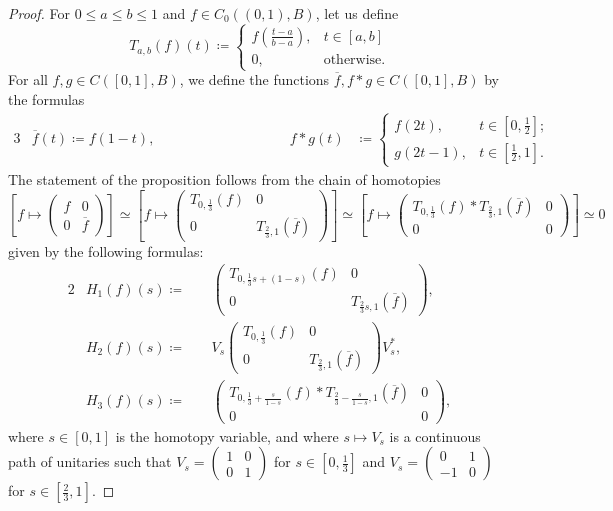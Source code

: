 \documentclass[10pt,a4paper]{amsart}
\begin{document}
\begin{proof}
For $0\leq a\leq b\leq1$ and $f\in C_{0}((0,1),B)$,
let us define
\[
T_{a,b}(f)(t)\coloneqq\begin{cases}
f\left(\frac{t-a}{b-a}\right), & t\in[a,b]\\
0, & \textrm{otherwise}.
\end{cases}
\]
For all $f,g\in C([0,1],B)$, we define the functions $\overline{f},f*g\in C([0,1],B)$
by the formulas
\begin{alignat*}{3}
 & \overline{f}(t)\coloneqq f(1-t), & \qquad\qquad\qquad\qquad & f*g(t) & \coloneqq\begin{cases}
f(2t), & t\in\left[0,\frac{1}{2}\right];\\
g(2t-1), & t\in\left[\frac{1}{2},1\right].
\end{cases}
\end{alignat*}
The statement of the proposition follows from the chain of homotopies
\[
\left[f\mapsto\left(\begin{array}{cc}
f & 0\\
0 & \overline{f}
\end{array}\right)\right]\simeq\left[f\mapsto\left(\begin{array}{cc}
T_{0,\frac{1}{3}}(f) & 0\\
0 & T_{\frac{2}{3},1}(\overline{f})
\end{array}\right)\right]\simeq\left[f\mapsto\left(\begin{array}{cc}
T_{0,\frac{1}{3}}(f)*T_{\frac{2}{3},1}(\overline{f}) & 0\\
0 & 0
\end{array}\right)\right]\simeq0
\]
given by the following formulas:
\begin{alignat*}{2}
 & H_{1}(f)(s)\coloneqq &\ 
& \left(\begin{array}{cc}
T_{0,\frac{1}{3}s+(1-s)}(f) & 0\\
0 & T_{\frac{2}{3}s,1}(\overline{f})
\end{array}\right),\\
 & H_{2}(f)(s)\coloneqq &\ 
& V_{s}\left(\begin{array}{cc}
T_{0,\frac{1}{3}}(f) & 0\\
0 & T_{\frac{2}{3},1}(\overline{f})
\end{array}\right)V^{*}_{s},\\
 & H_{3}(f)(s)\coloneqq &\ 
& \left(\begin{array}{cc}
T_{0,\frac{1}{3}+\frac{s}{1-s}}(f)*T_{\frac{2}{3}-\frac{s}{1-s},1}(\overline{f}) & 0\\
0 & 0
\end{array}\right),
\end{alignat*}
where $s\in[0,1]$ is the homotopy variable, and where $s\mapsto V_{s}$
is a continuous path of unitaries such that $V_{s}=\left(\begin{array}{cc}
1 & 0\\
0 & 1
\end{array}\right)$ for $s\in\left[0,\frac{1}{3}\right]$ and $V_{s}=\left(\begin{array}{cc}
0 & 1\\
-1 & 0
\end{array}\right)$ for $s\in\left[\frac{2}{3},1\right]$.

\end{proof}
\end{document}
